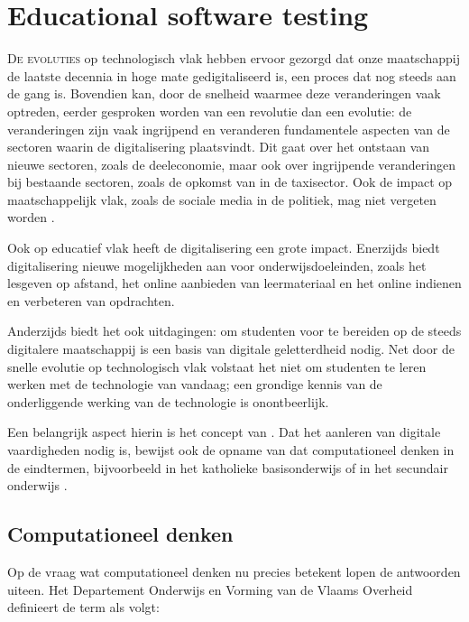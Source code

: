 \chapter{Educational software testing}\label{ch:dodona}

\lettrine{D}{e evoluties} op technologisch vlak hebben ervoor gezorgd dat onze maatschappij de laatste decennia in hoge mate gedigitaliseerd is, een proces dat nog steeds aan de gang is.
Bovendien kan, door de snelheid waarmee deze veranderingen vaak optreden, eerder gesproken worden van een revolutie dan een evolutie: de veranderingen zijn vaak ingrijpend en veranderen fundamentele aspecten van de sectoren waarin de digitalisering plaatsvindt.
Dit gaat over het ontstaan van nieuwe sectoren, zoals de deeleconomie, maar ook over ingrijpende veranderingen bij bestaande sectoren, zoals de opkomst van  in de taxisector.
Ook de impact op maatschappelijk vlak, zoals de sociale media in de politiek, mag niet vergeten worden \autocite{hipeac2019}.

Ook op educatief vlak heeft de digitalisering een grote impact.
Enerzijds biedt digitalisering nieuwe mogelijkheden aan voor onderwijsdoeleinden, zoals het lesgeven op afstand, het online aanbieden van leermateriaal en het online indienen en verbeteren van opdrachten.

Anderzijds biedt het ook uitdagingen: om studenten voor te bereiden op de steeds digitalere maatschappij is een basis van digitale geletterdheid nodig.
Net door de snelle evolutie op technologisch vlak volstaat het niet om studenten te leren werken met de technologie van vandaag;
een grondige kennis van de onderliggende werking van de technologie is onontbeerlijk.

Een belangrijk aspect hierin is het concept van .
Dat het aanleren van digitale vaardigheden nodig is, bewijst ook de opname van dat computationeel denken in de eindtermen, bijvoorbeeld in het katholieke basisonderwijs \autocite{zinin2017} of in het secundair onderwijs \autocite{2019040867}.

\section{Computationeel denken}\label{sec:computationeel-denken}

Op de vraag wat computationeel denken nu precies betekent lopen de antwoorden uiteen.
Het Departement Onderwijs en Vorming van de Vlaams Overheid \autocite{bastiaensen2017} definieert de term als volgt:


